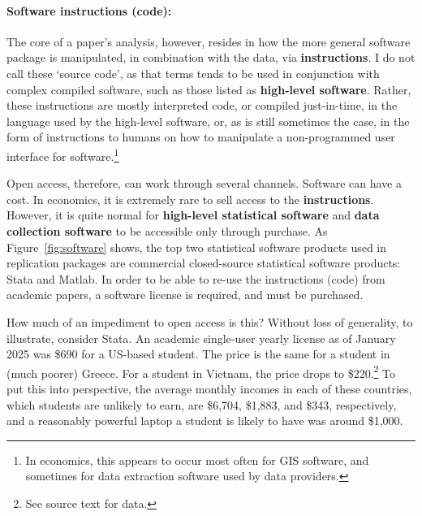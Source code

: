 \documentclass{article}
\begin{document}
\paragraph{Software instructions (code):} The core of a paper's analysis, however, resides in how the more general software package is manipulated, in combination with the data, via \textbf{instructions}. I do not call these `source code', as that terms tends to be used in conjunction with complex compiled software, such as those listed as \textbf{high-level software}. Rather, these instructions are mostly interpreted code, or compiled just-in-time, in the language used by the high-level software, or, as is still sometimes the case, in the form of instructions to humans on how to manipulate a non-programmed user interface for software.\footnote{In economics, this appears to occur most often for \ac{GIS} software, and sometimes for data extraction software used by data providers.}

Open access, therefore, can work through several channels. Software can have a cost. In economics, it is extremely rare to sell access to the \textbf{instructions}. However, it is quite normal for \textbf{high-level statistical software} and \textbf{data collection software} to be accessible only through purchase. As Figure~\ref{fig:software} shows, the top two statistical software products used in replication packages are commercial closed-source statistical software products: Stata and Matlab. In order to be able to re-use the instructions (code) from academic papers, a software license is required, and must be purchased. 

How much of an impediment to open access is this? Without loss of generality, to illustrate, consider Stata. An academic single-user yearly license as of January 2025 was \$690 for a US-based student. The price is the same for a student in (much poorer) Greece. For a student in Vietnam, the price drops to \$220.\footnote{See source text for data.}  To put this into perspective, the average monthly incomes in each of these countries, which students are unlikely to earn, are \$6,704, \$1,883, and \$343, respectively, and a reasonably powerful laptop a student is likely to have was around \$1,000. 



\end{document}
